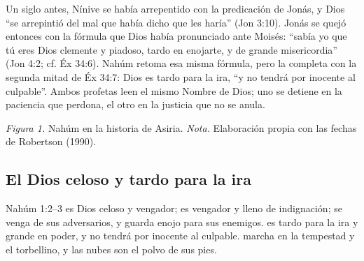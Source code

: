 Un siglo antes, Nínive se había arrepentido con la predicación de Jonás, y Dios ``se arrepintió del mal que había dicho que les haría'' (Jon 3:10). Jonás se quejó entonces con la fórmula que Dios había pronunciado ante Moisés: ``sabía yo que tú eres Dios clemente y piadoso, tardo en enojarte, y de grande misericordia'' (Jon 4:2; cf. Éx 34:6). Nahúm retoma esa misma fórmula, pero la completa con la segunda mitad de Éx 34:7: Dios es tardo para la ira, ``y no tendrá por inocente al culpable''. Ambos profetas leen el mismo Nombre de Dios; uno se detiene en la paciencia que perdona, el otro en la justicia que no se anula.

\begin{center}
\par
{\footnotesize\color{gris}\textit{Figura 1.} Nahúm en la historia de Asiria. \textit{Nota.} Elaboración propia con las fechas de Robertson (1990).}
\end{center}

\subsection{El Dios celoso y tardo para la ira}
\begin{verso}{Nahúm 1:2–3}
\SENOR{} es Dios celoso y vengador; \SENOR{} es vengador y lleno de indignación; se venga de sus adversarios, y guarda enojo para sus enemigos. \SENOR{} es tardo para la ira y grande en poder, y no tendrá por inocente al culpable. \SENOR{} marcha en la tempestad y el torbellino, y las nubes son el polvo de sus pies.
\end{verso}

